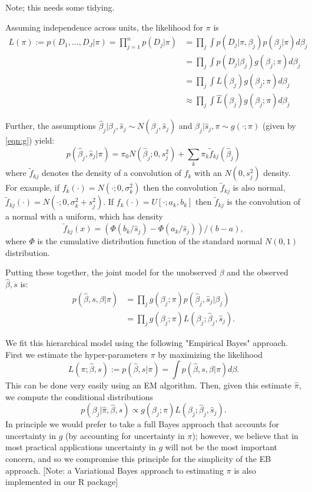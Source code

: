 \documentclass[11pt]{article}
\def\bhat{\hat{\beta}}
\def\shat{\hat{s}}
\begin{document}
Note; this needs some tidying.

Assuming independence across units, the likelihood for $\pi$ is 
\begin{align}
L(\pi) := p(D_1,\dots,D_J | \pi) = \prod_{j=1}^n p(D_j | \pi)
& = \prod_j \int p(D_j | \pi, \beta_j) p(\beta_j | \pi) d\beta_j \\
& = \prod_j \int p(D_j | \beta_j) g(\beta_j; \pi) d\beta_j \\
& = \prod_j \int L(\beta_j) g(\beta_j; \pi) d\beta_j \\
& \approx \prod_j \int \hat{L}(\beta_j) g(\beta_j; \pi) d\beta_j
\end{align}

Further, the assumptions  $\bhat_j | \beta_j, \shat_j \sim N(\beta_j,\shat_j)$ and $\beta_j | \shat_j, \pi \sim g(\cdot; \pi)$ (given by \ref{eqn:g}) yield: 
\begin{equation}
p(\bhat_j, \shat_j | \pi) = \pi_0 N(\bhat_j; 0,s^2_j) + \sum_k \pi_k \tilde{f}_{kj}(\bhat_j)
\end{equation}
where $\tilde{f}_{kj}$ denotes the density of a convolution of $f_k$ with an $N(0,s^2_j)$ density.
For example, if $f_k(\cdot) = N(\cdot; 0,\sigma^2_k)$ then the convolution $\tilde{f}_{kj}$ is also normal, $\tilde{f}_{kj}(\cdot) = N(\cdot; 0,\sigma^2_k + s^2_j)$. If
$f_k(\cdot) = U[\cdot; a_k,b_k]$ then $\tilde{f}_{kj}$ is the convolution of a normal with a uniform, which has density
\begin{equation}
\tilde{f}_{kj}(x) = (\Phi(b_k/\shat_j) - \Phi(a_k/\shat_j))/(b-a),
\end{equation}
where $\Phi$ is the cumulative distribution function of the standard normal $N(0,1)$ distribution.

Putting these together, the joint model for the unobserved $\beta$ and the observed $\bhat, s$ is:
\begin{align}
p(\bhat, s, \beta | \pi) & = \prod_j g(\beta_j ; \pi) p(\bhat_j, \shat_j | \beta_j) \\
& = \prod_j g(\beta_j ; \pi) L(\beta_j; \bhat_j,\shat_j).
\end{align}

We fit this hierarchical model using the following "Empirical Bayes" approach. First we estimate the hyper-parameters $\pi$ by maximizing the likelihood
\begin{equation}
L(\pi; \bhat, s) := p(\bhat, s | \pi) = \int p(\bhat, s, \beta | \pi) d\beta.
\end{equation}
This can be done very easily using an EM algorithm.
Then, given this estimate $\hat\pi$, we compute the conditional distributions 
\begin{equation}
p(\beta_j | \hat\pi, \bhat, s) \propto g(\beta_j; \pi) L(\beta_j; \bhat_j, \shat_j).
\end{equation} 
In principle we would
prefer to take a full Bayes approach that accounts for uncertainty in $g$ (by accounting for uncertainty in $\pi$); however,
we believe that in most practical applications uncertainty in $g$ will not be the most important concern, and so 
we compromise this principle for the simplicity of the EB approach.
[Note: a Variational Bayes approach to estimating $\pi$ is also implemented in our R package]
\end{document}
